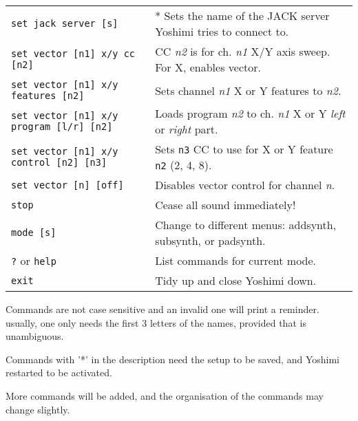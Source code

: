 \begin{table}[H]
\begin{tabular}{l l}
         \texttt{set jack server [s]} &
            * Sets the name of the JACK server Yoshimi tries to connect to. \\

         \texttt{set vector [n1] x/y cc [n2]} &
            CC \textsl{n2} is for ch. \textsl{n1} X/Y axis sweep.
            For X, enables vector. \\

         \texttt{set vector [n1] x/y features [n2]} &
            Sets channel \textsl{n1} X or Y features to \textsl{n2}. \\

         \texttt{set vector [n1] x/y program [l/r] [n2]} &
            Loads program \textsl{n2} to ch. \textsl{n1} X or Y
            \textsl{left} or \textsl{right} part. \\

         \texttt{set vector [n1] x/y control [n2] [n3]} &
            Sets \texttt{n3} CC to use for X or Y feature \texttt{n2}
            (2, 4, 8). \\

         \texttt{set vector [n] [off]} &
            Disables vector control for channel \textsl{n}. \\

         \texttt{stop} &
            Cease all sound immediately! \\

         \texttt{mode [s]} &
            Change to different menus: addsynth, subsynth, or padsynth. \\

         \texttt{?} or \texttt{help} &
            List commands for current mode. \\

         \texttt{exit} &
            Tidy up and close Yoshimi down. \\

      \end{tabular}
   \end{table}

   Commands are not case sensitive and an invalid one will print a reminder.
   usually, one only needs the first 3 letters of the names, provided that is
   unambiguous.

   Commands with '*' in the description need the setup to be saved, and Yoshimi
   restarted to be activated. 

   More commands will be added, and the organisation of the commands
   may change slightly.

